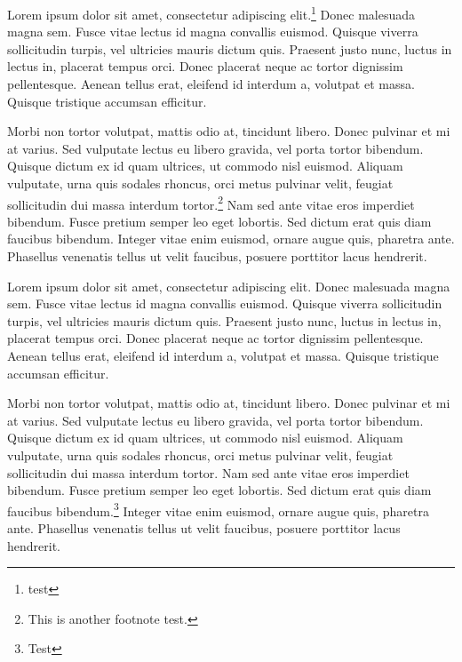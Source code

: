 Lorem ipsum dolor sit amet, consectetur adipiscing elit.\cite{feynman,statistics}\footnote{test}
Donec malesuada magna sem.
Fusce vitae lectus id magna convallis euismod.
Quisque viverra sollicitudin turpis, vel ultricies mauris dictum quis.
Praesent justo nunc, luctus in lectus in, placerat tempus orci.
Donec placerat neque ac tortor dignissim pellentesque.
Aenean tellus erat, eleifend id interdum a, volutpat et massa.
Quisque tristique accumsan efficitur.

Morbi non tortor volutpat, mattis odio at, tincidunt libero.
Donec pulvinar et mi at varius.
Sed vulputate lectus eu libero gravida, vel porta tortor bibendum.
Quisque dictum ex id quam ultrices, ut commodo nisl euismod.
Aliquam vulputate, urna quis sodales rhoncus, orci metus pulvinar velit, feugiat sollicitudin dui massa interdum tortor.\footnote{This is another footnote test.} %
Nam sed ante vitae eros imperdiet bibendum. 
Fusce pretium semper leo eget lobortis.
Sed dictum erat quis diam faucibus bibendum.
Integer vitae enim euismod, ornare augue quis, pharetra ante.
Phasellus venenatis tellus ut velit faucibus, posuere porttitor lacus hendrerit.

Lorem ipsum dolor sit amet, consectetur adipiscing elit.
Donec malesuada magna sem.
Fusce vitae lectus id magna convallis euismod.
Quisque viverra sollicitudin turpis, vel ultricies mauris dictum quis.
Praesent justo nunc, luctus in lectus in, placerat tempus orci.
Donec placerat neque ac tortor dignissim pellentesque.
Aenean tellus erat, eleifend id interdum a, volutpat et massa.
Quisque tristique accumsan efficitur.

Morbi non tortor volutpat, mattis odio at, tincidunt libero.
Donec pulvinar et mi at varius.
Sed vulputate lectus eu libero gravida, vel porta tortor bibendum.
Quisque dictum ex id quam ultrices, ut commodo nisl euismod.
Aliquam vulputate, urna quis sodales rhoncus, orci metus pulvinar velit, feugiat sollicitudin dui massa interdum tortor.
Nam sed ante vitae eros imperdiet bibendum.
Fusce pretium semper leo eget lobortis.
Sed dictum erat quis diam faucibus bibendum.\footnote{Test}
Integer vitae enim euismod, ornare augue quis, pharetra ante.
Phasellus venenatis tellus ut velit faucibus, posuere porttitor lacus hendrerit.
